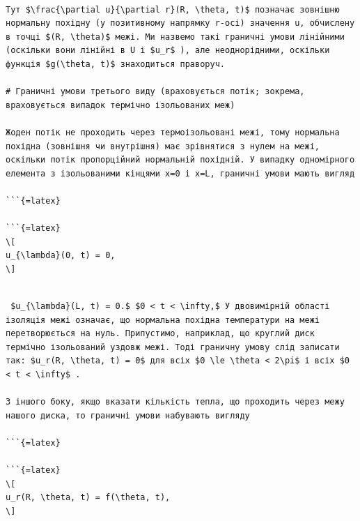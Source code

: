 \documentclass[
]{article}
\begin{document}
\begin{verbatim}

Тут $\frac{\partial u}{\partial r}(R, \theta, t)$ позначає зовнішню нормальну похідну (у позитивному напрямку r-осі) значення u, обчислену в точці $(R, \theta)$ межі. Ми назвемо такі граничні умови лінійними (оскільки вони лінійні в U і $u_r$ ), але неоднорідними, оскільки функція $g(\theta, t)$ знаходиться праворуч.

# Граничні умови третього виду (враховується потік; зокрема, враховується випадок термічно ізольованих меж)

Жоден потік не проходить через термоізольовані межі, тому нормальна похідна (зовнішня чи внутрішня) має зрівнятися з нулем на межі, оскільки потік пропорційний нормальній похідній. У випадку одномірного елемента з ізольованими кінцями x=0 і x=L, граничні умови мають вигляд

```{=latex}

```{=latex}
\[
u_{\lambda}(0, t) = 0,
\]
\end{verbatim}

\begin{verbatim}

 $u_{\lambda}(L, t) = 0.$ $0 < t < \infty,$ У двовимірній області ізоляція межі означає, що нормальна похідна температури на межі перетворюється на нуль. Припустимо, наприклад, що круглий диск термічно ізольований уздовж межі. Тоді граничну умову слід записати так: $u_r(R, \theta, t) = 0$ для всіх $0 \le \theta < 2\pi$ і всіх $0 < t < \infty$ .

З іншого боку, якщо вказати кількість тепла, що проходить через межу нашого диска, то граничні умови набувають вигляду

```{=latex}

```{=latex}
\[
u_r(R, \theta, t) = f(\theta, t),
\]
\end{verbatim}
\end{document}

